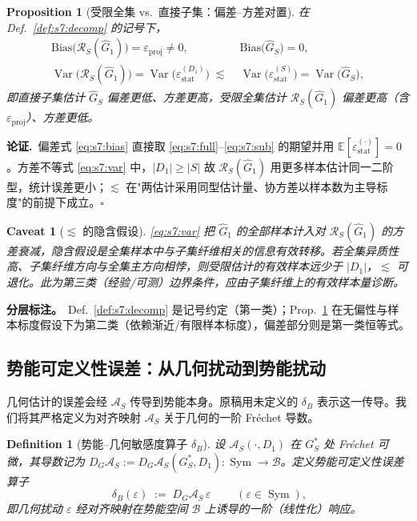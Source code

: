 \documentclass[11pt,a4paper]{article}
\newtheorem{proposition}[theorem]{Proposition}
\newtheorem{definition}[theorem]{Definition}
\newtheorem{caveat}[theorem]{Caveat}
\DeclareMathOperator{\Var}{Var}
\newcommand{\E}{\mathbb{E}}
\newcommand{\cB}{\mathcal{B}}   %
\newcommand{\Rstr}{\mathcal{R}}     %
\newcommand{\Sym}{\operatorname{Sym}}
\begin{document}
\begin{proposition}[受限全集 vs.\ 直接子集：偏差--方差对置]\label{prop:s7:biasvar}
在 Def.~\ref{def:s7:decomp} 的记号下，
\begin{align}
\mathrm{Bias}\bigl(\Rstr_S(\widehat{G}_1)\bigr)=\varepsilon_{\mathrm{proj}}\neq 0,\qquad
&\mathrm{Bias}\bigl(\widehat{G}_S\bigr)=0,\label{eq:s7:bias}\\
\Var\bigl(\Rstr_S(\widehat{G}_1)\bigr)=\Var\bigl(\varepsilon_{\mathrm{stat}}^{(D_1)}\bigr)\;\lesssim\;
&\Var\bigl(\varepsilon_{\mathrm{stat}}^{(S)}\bigr)=\Var\bigl(\widehat{G}_S\bigr),\label{eq:s7:var}
\end{align}
即直接子集估计 $\widehat{G}_S$ \emph{偏差更低、方差更高}，受限全集估计 $\Rstr_S(\widehat{G}_1)$ \emph{偏差更高（含 $\varepsilon_{\mathrm{proj}}$）、方差更低}。
\end{proposition}

\noindent\textbf{论证.}\ 偏差式 \eqref{eq:s7:bias} 直接取 \eqref{eq:s7:full}--\eqref{eq:s7:sub} 的期望并用 $\E[\varepsilon_{\mathrm{stat}}^{(\cdot)}]=0$。方差不等式 \eqref{eq:s7:var} 中，$|D_1|\ge|S|$ 故 $\Rstr_S(\widehat{G}_1)$ 用更多样本估计同一二阶型，统计误差更小；$\lesssim$ 在"两估计采用同型估计量、协方差以样本数为主导标度"的前提下成立。\hfill$\square$

\begin{caveat}[$\lesssim$ 的隐含假设]\label{cav:s7:var}
\eqref{eq:s7:var} 把 $\widehat{G}_1$ 的全部样本计入对 $\Rstr_S(\widehat{G}_1)$ 的方差衰减，隐含假设是\emph{全集样本中与子集纤维相关的信息有效转移}。若全集异质性高、子集纤维方向与全集主方向相悖，则受限估计的有效样本远少于 $|D_1|$，$\lesssim$ 可退化。此为第三类（经验/可测）边界条件，应由子集纤维上的有效样本量诊断。
\end{caveat}

\textbf{分层标注。}\ Def.~\ref{def:s7:decomp} 是记号约定（第一类）；Prop.~\ref{prop:s7:biasvar} 在无偏性与样本标度假设下为第二类（依赖渐近/有限样本标度），偏差部分则是第一类恒等式。

\subsection{势能可定义性误差：从几何扰动到势能扰动}\label{subsec:s7:deltaB}

几何估计的误差会经 $\mathcal{A}_S$ 传导到势能本身。原稿用未定义的 $\delta_B$ 表示这一传导。我们将其严格定义为对齐映射 $\mathcal{A}_S$ 关于几何的一阶 Fréchet 导数。

\begin{definition}[势能--几何敏感度算子 $\delta_B$]\label{def:s7:deltaB}
设 $\mathcal{A}_S(\cdot,D_1)$ 在 $G_S^*$ 处 Fréchet 可微，其导数记为 $D_G\mathcal{A}_S := D_G\mathcal{A}_S(G_S^*,D_1):\Sym\to\cB$。定义\emph{势能可定义性误差算子}
\begin{equation}\label{eq:s7:deltaB}
\boxed{\;\delta_B(\varepsilon)\;:=\;D_G\mathcal{A}_S\,\varepsilon\;}\qquad(\varepsilon\in\Sym),
\end{equation}
即几何扰动 $\varepsilon$ 经对齐映射在势能空间 $\cB$ 上诱导的一阶（线性化）响应。
\end{definition}
\end{document}

